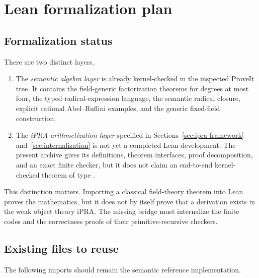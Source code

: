 \section{Lean formalization plan}
\label{sec:lean-plan}

\subsection{Formalization status}

There are two distinct layers.

\begin{enumerate}
\item The \emph{semantic algebra layer} is already kernel-checked in the
  inspected ProveIt tree.  It contains the field-generic factorization
  theorems for degrees at most four, the typed radical-expression language,
  the semantic radical closure, explicit rational Abel--Ruffini examples, and
  the generic fixed-field construction.
\item The \emph{iPRA arithmetization layer} specified in
  Sections~\ref{sec:ipra-framework} and~\ref{sec:internalization} is not yet a
  completed Lean development.  The present archive gives its definitions,
  theorem interfaces, proof decomposition, and an exact finite checker, but
  it does not claim an end-to-end kernel-checked theorem of type
  .
\end{enumerate}

This distinction matters.  Importing a classical field-theory theorem into
Lean proves the mathematics, but it does not by itself prove that a derivation
exists in the weak object theory iPRA.  The missing bridge must internalize the
finite codes and the correctness proofs of their primitive-recursive
checkers.

\subsection{Existing files to reuse}

The following imports should remain the semantic reference implementation.

